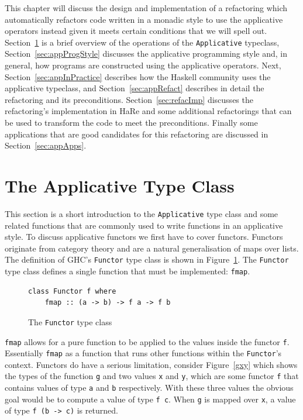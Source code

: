 This chapter will discuss the design and implementation of a refactoring which automatically refactors code written in a monadic style to use the applicative operators instead given it meets certain conditions that we will spell out. Section~\ref{sec:appOverview} is a brief overview of the operations of the \texttt{Applicative} typeclass, Section~\ref{sec:appProgStyle} discusses the applicative programming style and, in general, how programs are constructed using the applicative operators. Next, Section~\ref{sec:appInPractice} describes how the Haskell community uses the applicative typeclass, and Section~\ref{sec:appRefact} describes in detail the refactoring and its preconditions. Section~\ref{sec:refacImp} discusses the refactoring's implementation in HaRe and some additional refactorings that can be used to transform the code to meet the preconditions. Finally some applications that are good candidates for this refactoring are discussed in Section~\ref{sec:appApps}.

\section{The Applicative Type Class}
\label{sec:appOverview}
This section is a short introduction to the \texttt{Applicative} type class and some related functions that are commonly used to write functions in an applicative style. 
To discuss applicative functors we first have to cover functors. Functors originate from category theory and are a natural generalisation of maps over lists. The definition of GHC's \texttt{Functor} type class is shown in Figure~\ref{functor}. The \texttt{Functor} type class defines a single function that must be implemented: \texttt{fmap}.

\begin{figure}
\begin{lstlisting}
class Functor f where
	fmap :: (a -> b) -> f a -> f b
\end{lstlisting}
\caption{The \texttt{Functor} type class}
\label{functor}
\end{figure}

\texttt{fmap} allows for a pure function to be applied to the values inside the functor \texttt{f}. Essentially \texttt{fmap} as a function that runs other functions within the \texttt{Functor}'s context. Functors do have a serious limitation, consider Figure~\ref{gxy} which shows the types of the function \texttt{g} and two values \texttt{x} and \texttt{y}, which are some functor \texttt{f} that contains values of type \texttt{a} and \texttt{b} respectively. With these three values the obvious goal would be to compute a value of type \texttt{f c}. When \texttt{g} is mapped over   \texttt{x}, a value of type \texttt{f (b -> c)} is returned.

